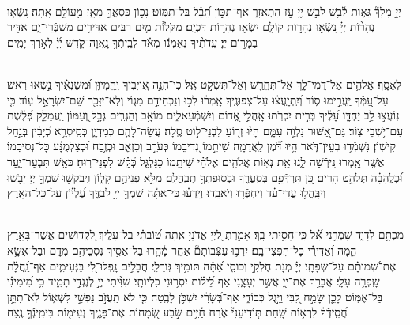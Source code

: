 \documentclass[twoside, openany, parskip=half, 11pt]{book}
\begin{document}
\\
 יְיָ֣ מָלָךְ֘ גֵּא֢וּת לָ֫בֵ֥שׁ לָבֵ֣שׁ יְ֖יָ עֹ֣ז הִתְאַזָּר֑ אַף־תִּכּ֣וֹן תֵּ֝בֵ֗ל בַּל־תִּמּֽוֹט׃ נָכ֣וֹן כִּסְאֲךָ֣ מֵאָ֑ז מֵ֖עוֹלָ֣ם אָֽתָּה׃ נָֽשְֿׂא֤וּ נְהָר֨וֹת יְיָ֗ נָֽשְֿׂא֣וּ נְהָר֣וֹת קוֹלָ֑ם יִשְׂא֖וּ נְהָר֣וֹת דָּכְיָֽם׃ מִקֹּל֙וֹת מַ֤יִם רַבִּים אַדִּירִ֥ים מִשְׁבְּֿרֵי־יָ֑ם אַדִּ֖יר בַּמָּר֣וֹם יְיָ׃  עֵֽדֹתֶ֨יךָ נֶאֶמְנ֬וּ מְאֹ֗ד לְבֵֽיתְֿךָ֥ נָֽאֲוָה־קֹּ֑דֶשׁ יְ֜יָ֗ לְאֹ֣רֶךְ יָמִֽים׃



 
\label{kaddish_yasom_shacharis}


\mournerskaddish

 
\\
  לְאָסָֽף׃ אֱלֹהִ֥ים אַל־דֳּמִי־לָ֑ךְ אַל־תֶּחֱרַ֖שׁ וְאַל־תִּשְׁקֹ֣ט אֵֽל׃ כִּי־הִנֵּ֣ה אֽ֭וֹיְֿבֶיךָ יֶֽהֱמָיוּ֑ן וּ֝מְשַׂנְאֶ֗יךָ נָ֣שְֿׂאוּ רֹֽאשׁ׃ עַל־עַ֭מְּֿךָ יַֽעֲרִ֣ימוּ ס֑וֹד וְ֝יִֽתְיָֽעֲצ֗וּ עַל־צְפוּנֶֽיךָ׃ אָֽמְר֗וּ לְכ֣וּ וְנַכְחִידֵ֣ם מִגּ֑וֹי וְלֹֽא־יִזָּכֵ֖ר שֵׁם־יִשְׂרָאֵ֣ל עֽוֹד׃ כִּ֤י נֽוֹעֲצ֣וּ לֵ֣ב יַחְדָּ֑ו עָ֝לֶ֗יךָ בְּרִ֣ית יִכְרֹֽתוּ׃ אָֽהֳלֵ֣י אֱ֭דוֹם וְיִשְׁמְֿעֵאלִ֑֗ים מוֹאָ֥ב וְהַגְרִֽים׃ גְּבָ֣ל וְ֭עַמּוֹן וַֽעֲמָלֵ֑ק פְּ֝לֶ֗שֶׁת עִם־י֥שְׁבֵי צֽוֹר׃ גַּם־אַ֭שּׁוּר נִלְוָ֣ה עִמָּ֑ם הָי֙וּ זְר֖וֹעַ לִבְנֵי־ל֣וֹט סֶֽלָה׃ עֲשֵׂה־לָהֶ֥ם כְּמִדְיָ֑ן כְּסִֽיסְרָ֥א כְ֝יָבִ֗ין בְּנַ֣חַל קִישֽׁוֹן׃ נִשְׁמְֿד֥וּ בְעֵין־דֹּ֑אר הָ֥יוּ דֹּ֝֗מֶן לַֽאֲדָמָֽה׃ שִׁיתֵ֣מוֹ נְ֭דִיבֵמוֹ כְּעֹרֵ֣ב וְכִזְאֵ֑ב וּכְזֶ֥בַח וּ֝כְצַלְמֻנָּ֗ע כָּל־נְסִיכֵֽמוֹ׃ אֲשֶׁ֣ר אָֽ֭מְרוּ נִ֣ירְֿשָׁה לָּ֑נוּ אֵ֖ת נְא֣וֹת אֱלֹהִֽים׃ אֱלֹהַ֗י שִׁיתֵ֥מוֹ כַגַּלְגַּ֑ל כְּ֝קַ֗שׁ לִפְנֵי־רֽוּחַ׃ כְּאֵ֥שׁ תִּבְעַר־יָ֑עַר וּ֝כְלֶֽהָבָ֗ה תְּלַהֵ֥ט הָרִֽים׃  כֵּ֭ן תִּרְדְּֿפֵ֣ם בְּסַֽעֲרֶ֑ךָ וּבְסוּפָֽתְךָ֥ תְבַֽהֲלֵֽם׃ מַלֵּ֣א פְנֵיהֶ֣ם קָל֑וֹן וִֽיבַקְשׁ֖וּ שִׁמְךָ֣ יְיָ׃ יֵבֹ֖שׁוּ וְיִבָּֽהֲל֥וּ עֲדֵי־עַ֗ד וְיַחְפְּֿר֥וּ וְיֹאבֵֽדוּ׃  וְיֵֽדְע֗וּ כִּי־אַתָּ֬ה שִׁמְךָ֣ יְיָ֣ לְבַדֶּ֑ךָ עֶ֝לְי֗וֹן עַל־כָּל־הָאָֽרֶץ׃

\\
 מִכְתָּ֥ם לְדָוִ֑ד שָׁמְרֵ֥נִי אֵ֝֗ל כִּֽי־חָסִ֥יתִי בָֽךְ׃ אָמַ֣רְתְּ לַ֭יְיָ אֲדֹנָי֥ אַֽתָּה ט֝וֹבָתִ֗י בַּל־עָלֶֽיךָ׃ לִ֭קְדוֹשִׁים אֲשֶׁר־בָּאָ֣רֶץ הֵ֑מָּה וְ֝אַדִּירֵ֗י כָּל־חֶפְצִי־בָֽם׃ יִרְבּ֥וּ עַצְּֿבוֹתָם֘ אַחֵ֢ר מָ֫הָ֥רוּ בַּל־אַסִּ֣יךְ נִסְכֵּיהֶ֣ם מִדָּ֑ם וּבַל־אֶשָּׂ֥א אֶת־שְׁ֝מוֹתָ֗ם עַל־שְׂפָתָֽי׃ יְיָ֗ מְנָת חֶלְקִ֣י וְכוֹסִ֑י אַ֝תָּ֗ה תּוֹמִ֥יךְ גּֽוֹרָלִֽי׃ חֲבָלִ֣ים נָֽפְלוּ־לִ֭י בַּנְּֿעִימִ֑ים אַף־נַֽ֝חֲלָ֗ת שָֽׁפְרָ֥ה עָלָֽי׃ אֲבָרֵ֣ךְ אֶת־יְ֖יָ אֲשֶׁ֣ר יְעָצָ֑נִי אַף לֵ֝יל֗וֹת יִסְּֿר֥וּנִי כִלְיוֹתָֽי׃ שִׁוִּ֨יתִי יְיָ֣ לְנֶגְדִּ֣י תָמִ֑יד כִּ֥י מִ֝ימִינִ֗י בַּל־אֶמּֽוֹט׃ לָכֵ֤ן שָׂמַ֣ח לִ֭בִּי וַיָּ֣גֶל כְּבוֹדִ֑י אַף־בְּ֝שָׂרִ֗י יִשְׁכֹּ֥ן לָבֶֽטַח׃ כִּ֤י לֹא תַֽעֲזֹ֣ב נַפְשִׁ֣י לִשְׁא֑וֹל לֹֽא־תִתֵּ֥ן חֲ֝סִֽידְֿךָ֗ לִרְא֥וֹת שָֽׁחַת׃  תּ֤וֹדִיעֵנִי֘ אֹ֢רַח חַ֫יִּ֥ים שׂ֣בַע שְׂ֭מָחוֹת אֶת־פָּנֶ֑יךָ נְעִימ֖וֹת בִּימִֽינְֿךָ֣ נֶֽצַח׃
\end{document}
